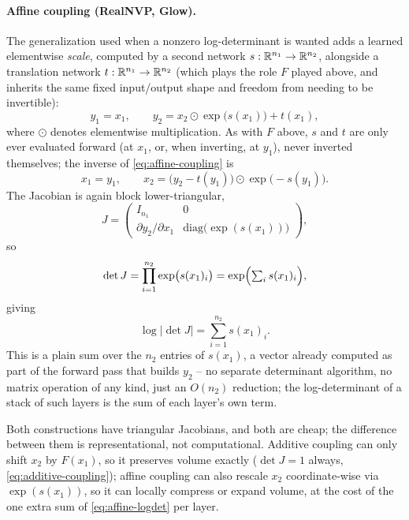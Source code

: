 \paragraph{Affine coupling (RealNVP, Glow).} The generalization used when a nonzero log-determinant is
wanted adds a learned elementwise \emph{scale}, computed by a second network $s:\mathbb{R}^{n_1}\to\mathbb{R}^{n_2}$,
alongside a translation network $t:\mathbb{R}^{n_1}\to\mathbb{R}^{n_2}$ (which plays the role $F$ played above, and
inherits the same fixed input/output shape and freedom from needing to be invertible):
\begin{equation}
y_1=x_1,\qquad y_2=x_2\odot\exp\bigl(s(x_1)\bigr)+t(x_1),
\label{eq:affine-coupling}
\end{equation}
where $\odot$ denotes elementwise multiplication. As with $F$ above, $s$ and $t$ are only ever evaluated
forward (at $x_1$, or, when inverting, at $y_1$), never inverted themselves; the inverse of
\cref{eq:affine-coupling} is
\[
x_1=y_1,\qquad x_2=\bigl(y_2-t(y_1)\bigr)\odot\exp\bigl(-s(y_1)\bigr).
\]
The Jacobian is again block lower-triangular,
\[
J=\begin{pmatrix}
I_{n_1} & 0\\[2pt]
\partial y_2/\partial x_1 & \mathrm{diag}\bigl(\exp(s(x_1))\bigr)
\end{pmatrix},
\]
so
\[
\det J=\prod_{i=1}^{n_2}\exp\bigl(s(x_1)_i\bigr)=\exp\Bigl(\textstyle\sum_i s(x_1)_i\Bigr),
\]
giving
\begin{equation}
\log\bigl|\det J\bigr| = \sum_{i=1}^{n_2} s(x_1)_i.
\label{eq:affine-logdet}
\end{equation}
This is a plain sum over the $n_2$ entries of $s(x_1)$, a vector already computed as part of the forward
pass that builds $y_2$ -- no separate determinant algorithm, no matrix operation of any kind, just an
$O(n_2)$ reduction; the log-determinant of a stack of such layers is the sum of each layer's own term.

Both constructions have triangular Jacobians, and both are cheap; the difference between them is
representational, not computational. Additive coupling can only shift $x_2$ by $F(x_1)$, so it preserves
volume exactly ($\det J=1$ always, \cref{eq:additive-coupling}); affine coupling can also rescale $x_2$
coordinate-wise via $\exp(s(x_1))$, so it can locally compress or expand volume, at the cost of the one
extra sum of \cref{eq:affine-logdet} per layer.

